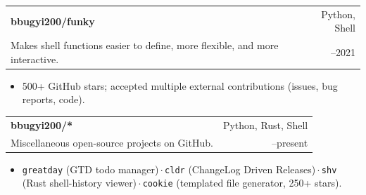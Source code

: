 \documentclass[letterpaper,10pt]{article}
\makeatletter
\newcommand{\projsubheading}[4]{%
  \par\addvspace{3pt}%
  \noindent
  \begin{tabular*}{\textwidth}{@{}l@{\extracolsep{\fill}}r@{}}
    {\bfseries\color{lcink}\fontsize{10.4pt}{12.4pt}\selectfont #1} &
    {\ttfamily\color{lcslate}\fontsize{8.6pt}{10.3pt}\selectfont #2} \\[0.5pt]
    {\color{lcink}\fontsize{9.9pt}{11.7pt}\selectfont #3} &
    {\color{lcslate}\fontsize{8.8pt}{10.5pt}\selectfont #4}
  \end{tabular*}\par\vspace{-3pt}
}
\makeatother
\begin{document}
\projsubheading{bbugyi200/funky}{Python, Shell}{Makes shell functions easier to define, more flexible, and more interactive.}{2017--2021}
\begin{itemize}
  \item 500+ GitHub stars; accepted multiple external contributions (issues, bug reports, code).
\end{itemize}

\projsubheading{bbugyi200/*}{Python, Rust, Shell}{Miscellaneous open-source projects on GitHub.}{2017--present}
\begin{itemize}
  \item \texttt{greatday} (GTD todo manager)\,$\cdot$\,\texttt{cldr} (ChangeLog Driven Releases)\,$\cdot$\,\texttt{shv} (Rust shell-history viewer)\,$\cdot$\,\texttt{cookie} (templated file generator, 250+ stars).
\end{itemize}
\end{document}
